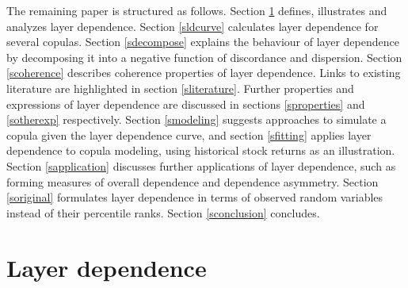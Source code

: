 \documentclass[authoryear]{elsarticle}
\newcommand{\aref}[1]{\ref{#1}}
\begin{document}
The remaining paper is structured as follows. Section \aref{sintroduction} defines, illustrates and analyzes layer dependence. Section \aref{sldcurve} calculates layer dependence for several copulas. Section \aref{sdecompose} explains the behaviour of layer dependence by decomposing it into a negative function of discordance and dispersion. Section \aref{scoherence} describes coherence properties of layer dependence. Links to existing literature are highlighted in section \aref{sliterature}. Further properties and expressions of layer dependence are discussed in sections \aref{sproperties} and \aref{sotherexp} respectively. Section \aref{smodeling} suggests approaches to simulate a copula given the layer dependence curve, and section \aref{sfitting} applies layer dependence to copula modeling, using historical stock returns as an illustration. Section \aref{sapplication} discusses further applications of layer dependence, such as forming measures of overall dependence and dependence asymmetry. Section \aref{soriginal} formulates layer dependence in terms of observed random variables instead of their percentile ranks. Section \aref{sconclusion} concludes.

\section{Layer dependence}\label{sintroduction}
\end{document}
